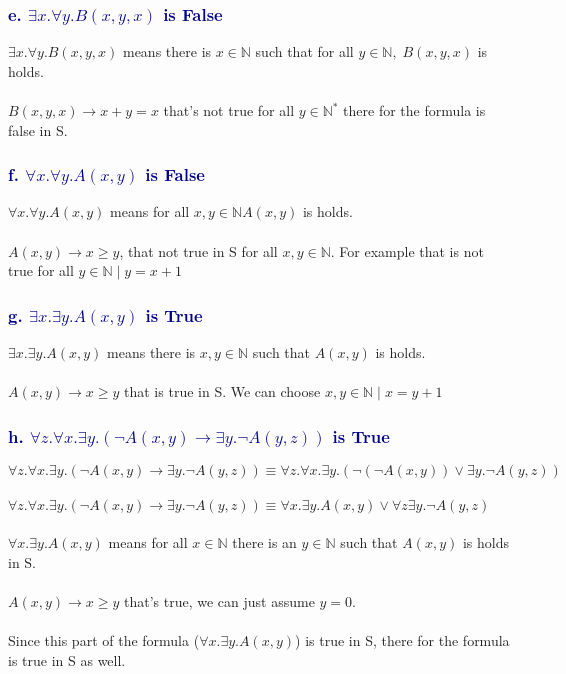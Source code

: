 \documentclass[12pt]{article}
\theoremstyle{definition}
\theoremstyle{plain}
\begin{document}
\subsubsection*{\textcolor{darkblue}{e. $\exists x. \forall y.B(x,y,x)$ is False}}
$\exists x. \forall y.B(x,y,x)$ means there is $x \in \mathbb{N}$ such that for all $y \in \mathbb{N},\; B(x,y,x)$ is holds.\\\\
$B(x,y,x) \rightarrow x + y = x$ that's not true for all $y \in \mathbb{N^*}$ there for the formula is false in S.

\subsubsection*{\textcolor{darkblue}{f. $\forall x. \forall y.A(x,y)$ is False}}
$\forall x. \forall y.A(x,y)$ means for all $x, y \in \mathbb{N} A(x,y)$ is holds.\\\\
$A(x,y) \rightarrow x \geq y$, that not true in S for all $x, y \in \mathbb{N}$. For example that is not true for all $y \in \mathbb{N}\; \vert\; y = x + 1$

\subsubsection*{\textcolor{darkblue}{g. $\exists x. \exists y.A(x,y)$ is True}}
$\exists x. \exists y.A(x,y)$ means there is $x , y \in \mathbb{N}$ such that $A(x, y)$ is holds.\\\\
$A(x,y) \rightarrow x \geq y$ that is true in S. We can choose $x, y \in \mathbb{N}\;|\; x = y + 1$

\subsubsection*{\textcolor{darkblue}{h. $\forall z. \forall x. \exists y.(\neg A(x,y) \rightarrow \exists y. \neg A(y,z))$ is True}}
$\forall z. \forall x. \exists y.(\neg A(x,y) \rightarrow \exists y. \neg A(y,z)) \equiv \forall z. \forall x. \exists y.(\neg(\neg A(x,y)) \vee \exists y. \neg A(y,z))$\\\\
$\forall z. \forall x. \exists y.(\neg A(x,y) \rightarrow \exists y. \neg A(y,z)) \equiv \forall x. \exists y.A(x,y) \vee \forall z \exists y. \neg A(y,z)$\\\\
$\forall x. \exists y.A(x,y)$ means for all $x \in \mathbb{N}$ there is an $y \in \mathbb{N}$ such that $A(x,y)$ is holds in S.\\\\
$A(x,y) \rightarrow x \geq y$ that's true, we can just assume $y = 0$.\\\\
Since this part of the formula ($\forall x. \exists y.A(x,y)$)  is true in S, there for the formula is true in S as well.
\end{document}
